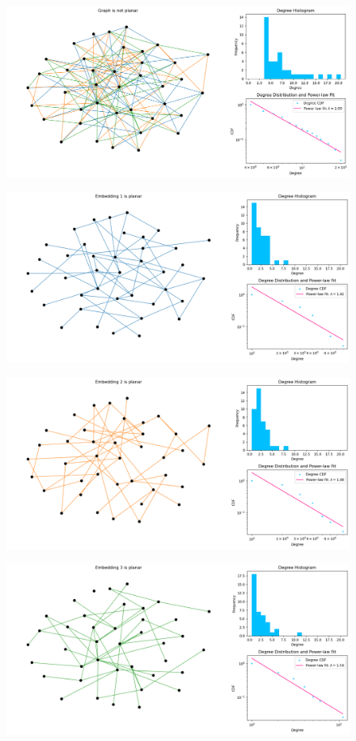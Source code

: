\documentclass{article}
\begin{document}
\begin{figure}[h]
    \centering
    \includegraphics[width=12cm]{../a1-1.png}
\end{figure}
\begin{figure}[h]
    \centering
    \includegraphics[width=12cm]{../a1-2.png}
\end{figure}
\begin{figure}[h]
    \centering
    \includegraphics[width=12cm]{../a1-3.png}
\end{figure}
\begin{figure}[h]
    \centering
    \includegraphics[width=12cm]{../a1-4.png}
\end{figure}
\end{document}
